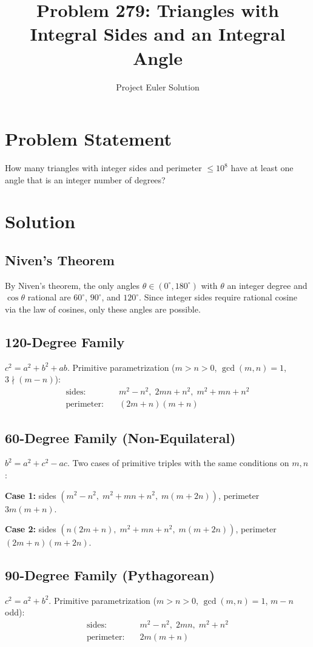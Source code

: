 \documentclass[12pt]{article}
\title{Problem 279: Triangles with Integral Sides and an Integral Angle}
\author{Project Euler Solution}
\date{}
\begin{document}
\maketitle

\section{Problem Statement}
How many triangles with integer sides and perimeter $\le 10^8$ have at least one angle that is an integer number of degrees?

\section{Solution}

\subsection{Niven's Theorem}
By Niven's theorem, the only angles $\theta \in (0^\circ, 180^\circ)$ with $\theta$ an integer degree and $\cos\theta$ rational are $60^\circ$, $90^\circ$, and $120^\circ$. Since integer sides require rational cosine via the law of cosines, only these angles are possible.

\subsection{120-Degree Family}
$c^2 = a^2 + b^2 + ab$. Primitive parametrization ($m > n > 0$, $\gcd(m,n)=1$, $3 \nmid (m-n)$):
\begin{align}
\text{sides:} &\quad m^2-n^2,\; 2mn+n^2,\; m^2+mn+n^2 \\
\text{perimeter:} &\quad (2m+n)(m+n)
\end{align}

\subsection{60-Degree Family (Non-Equilateral)}
$b^2 = a^2 + c^2 - ac$. Two cases of primitive triples with the same conditions on $m,n$:

\textbf{Case 1:} sides $(m^2-n^2,\; m^2+mn+n^2,\; m(m+2n))$, perimeter $3m(m+n)$.

\textbf{Case 2:} sides $(n(2m+n),\; m^2+mn+n^2,\; m(m+2n))$, perimeter $(2m+n)(m+2n)$.

\subsection{90-Degree Family (Pythagorean)}
$c^2 = a^2 + b^2$. Primitive parametrization ($m > n > 0$, $\gcd(m,n)=1$, $m-n$ odd):
\begin{align}
\text{sides:} &\quad m^2-n^2,\; 2mn,\; m^2+n^2 \\
\text{perimeter:} &\quad 2m(m+n)
\end{align}
\end{document}
